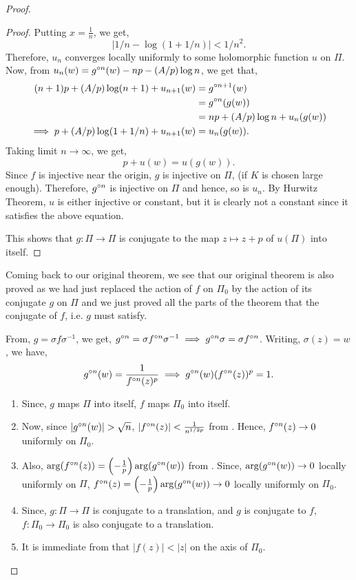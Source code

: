 \begin{proof}
\begin{proof}
Putting \( x=\frac{1}{n} \), we get, \[
	|1 /n-\log (1+ 1 /n)|<1 /n^2
.\] 
Therefore, \( u_n\) converges locally uniformly to some holomorphic function \( u \) on \( \Pi \).\\
Now, from \( u_n(w)=\gog[n](w)-np-(A /p)\log n \), we get that, 
\begin{align*}
	(n+1)p+(A /p)\log (n+1)+u_{n+1}(w)&=\gog[n+1](w)\\
									  &=\gog[n](g(w))\\
									  &=np+(A /p)\log n+u_n(g(w))\\
	\implies p+(A /p)\log (1+1 /n)+u_{n+1}(w)&=u_n(g(w))
.\end{align*}
Taking limit \( n\to \infty \), we get, \[
	p+u(w)=u(g(w))
.\] 
Since \( f \) is injective near the origin, \( g \) is injective on \( \Pi \),
(if \( K \) is chosen large enough). Therefore, \( \gog[n] \) is injective on \( \Pi \)
and hence, so is \( u_n \). By Hurwitz Theorem, \( u \) is either injective or constant, but it
is clearly not a constant since it satisfies the above equation.

This shows that \( g:\Pi\to \Pi \) is conjugate to the map \( z\mapsto z+p \) of \( u(\Pi) \) into
itself.
\end{proof}

Coming back to our original theorem, we see that our original theorem is also 
proved as we had just replaced the action of \( f \) on \( \Pi_0 \) by the action of 
its conjugate \( g \) on \( \Pi \) and we just proved all the parts of the theorem that
the conjugate of \( f \), i.e. \( g \) must satisfy.

From, \( g=\sigma f\sigma^{-1} \), we get,
\( \gog[n]=\sigma \fof[n]\sigma^{-1}\implies\gog[n]\sigma= \sigma\fof[n]\). 
Writing, \( \sigma(z)=w \), we have,
\begin{align}
	\gog[n](w)=\frac{1}{\fof[n](z)^p}\implies\gog[n](w)(\fof[n](z))^p=1\label{eqn8}
.\end{align}
\begin{enumerate}
	\item Since, \( g \) maps \( \Pi \) into itself, \( f \) maps \( \Pi_0 \) into itself.
	\item Now, since \( |\gog[n](w)|>\sqrt{n}  \), \( |\fof[n](z)|<\frac{1}{n^{1/2p}} \) from . Hence, \( \fof[n](z)\to 0 \) uniformly on \( \Pi_0 \).
	\item Also, \( \arg(\fof[n](z))=\left(-\frac{1}{p}\right)\arg(\gog[n](w)) \) from . Since, \( \arg(\gog[n](w))\to 0 \) locally uniformly on \( \Pi \), \( \fof[n](z)=\left(-\frac{1}{p}\right)\arg(\gog[n](w))\to 0 \) locally uniformly on \( \Pi_0 \).
	\item Since, \( g:\Pi\to \Pi \) is conjugate to a translation, and \( g \) is conjugate to \( f \), \( f:\Pi_0\to \Pi_0 \) is also conjugate to a translation.
	\item It is immediate from  that \( |f(z)|<|z| \) on the axis of \( \Pi_0 \).
\end{enumerate}


\end{proof}
